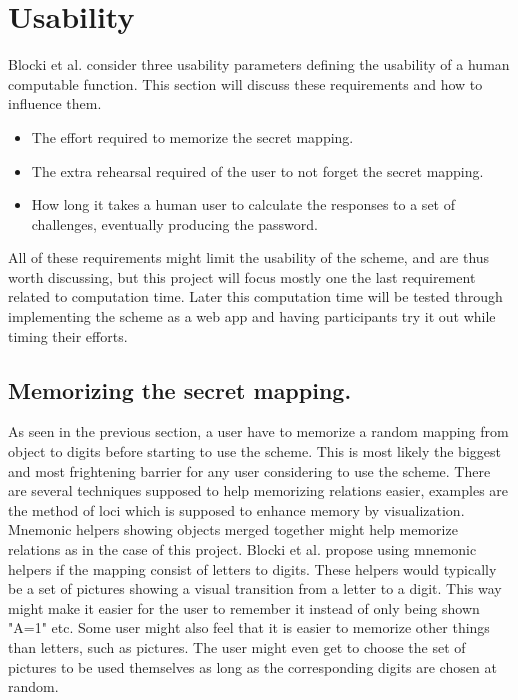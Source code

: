 \section{Usability}
Blocki et al. \cite{hcp-blocki} consider three usability parameters defining the usability of a human computable function. This section will discuss these requirements and how to influence them. 
\begin{itemize}
    \item The effort required to memorize the secret mapping.
    \item The extra rehearsal required of the user to not forget the secret mapping. 
    \item How long it takes a human user to calculate the responses to a set of challenges, eventually producing the password. 
\end{itemize}
All of these requirements might limit the usability of the scheme, and are thus worth discussing, but this project will focus mostly one the last requirement related to computation time. Later this computation time will be tested through implementing the scheme as a web app and having participants try it out while timing their efforts.

\subsection{Memorizing the secret mapping.}
As seen in the previous section, a user have to memorize a random mapping from object to digits before starting to use the scheme. This is most likely the biggest and most frightening barrier for any user considering to use the scheme. There are several techniques supposed to help memorizing relations easier, examples are the method of loci \cite{human-memory} which is supposed to enhance memory by visualization. Mnemonic helpers showing objects merged together might help memorize relations as in the case of this project. Blocki et al. \cite{hcp-blocki} propose using mnemonic helpers if the mapping consist of letters to digits. These helpers would typically be a set of pictures showing a visual transition from a letter to a digit. This way might make it easier for the user to remember it instead of only being shown "A=1" etc. Some user might also feel that it is easier to memorize other things than letters, such as pictures. The user might even get to choose the set of pictures to be used themselves as long as the corresponding digits are chosen at random. 

